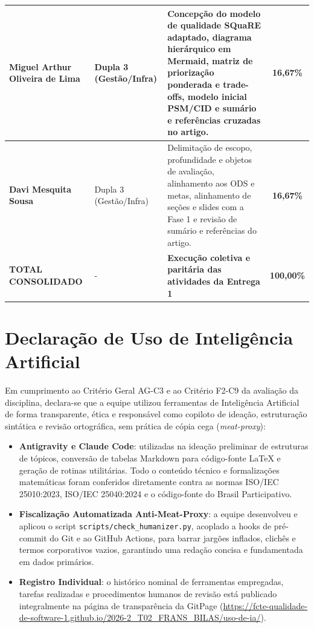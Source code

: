 \documentclass[journal]{IEEEtran}
\begin{document}
\begin{table}[!t]
\begin{tabular}{@{}p{} p{} p{} c@{}}
\midrule
\textbf{Miguel Arthur Oliveira de Lima} & Dupla 3 (Gestão/Infra) & Concepção do modelo de qualidade SQuaRE adaptado, diagrama hierárquico em Mermaid, matriz de priorização ponderada e trade-offs, modelo inicial PSM/CID e sumário e referências cruzadas no artigo. & \textbf{16,67\%} \\
\midrule
\textbf{Davi Mesquita Sousa} & Dupla 3 (Gestão/Infra) & Delimitação de escopo, profundidade e objetos de avaliação, alinhamento aos ODS e metas, alinhamento de seções e slides com a Fase 1 e revisão de sumário e referências do artigo. & \textbf{16,67\%} \\
\midrule
\textbf{TOTAL CONSOLIDADO} & - & \textbf{Execução coletiva e paritária das atividades da Entrega 1} & \textbf{100,00\%} \\
\bottomrule
\end{tabular}
\end{table}

\section{Declaração de Uso de Inteligência Artificial}
\label{app:uso_ia}

Em cumprimento ao Critério Geral AG-C3 e ao Critério F2-C9 da avaliação da disciplina, declara-se que a equipe utilizou ferramentas de Inteligência Artificial de forma transparente, ética e responsável como copiloto de ideação, estruturação sintática e revisão ortográfica, sem prática de cópia cega (\textit{meat-proxy}):

\begin{itemize}
    \item \textbf{Antigravity e Claude Code}: utilizadas na ideação preliminar de estruturas de tópicos, conversão de tabelas Markdown para código-fonte LaTeX e geração de rotinas utilitárias. Todo o conteúdo técnico e formalizações matemáticas foram conferidos diretamente contra as normas ISO/IEC 25010:2023, ISO/IEC 25040:2024 e o código-fonte do Brasil Participativo.
    \item \textbf{Fiscalização Automatizada Anti-Meat-Proxy}: a equipe desenvolveu e aplicou o script \texttt{scripts/check\_humanizer.py}, acoplado a hooks de pré-commit do Git e ao GitHub Actions, para barrar jargões inflados, clichês e termos corporativos vazios, garantindo uma redação concisa e fundamentada em dados primários.
    \item \textbf{Registro Individual}: o histórico nominal de ferramentas empregadas, tarefas realizadas e procedimentos humanos de revisão está publicado integralmente na página de transparência da GitPage (\url{https://fcte-qualidade-de-software-1.github.io/2026-2_T02_FRANS_BILAS/uso-de-ia/}).
\end{itemize}
\end{document}
